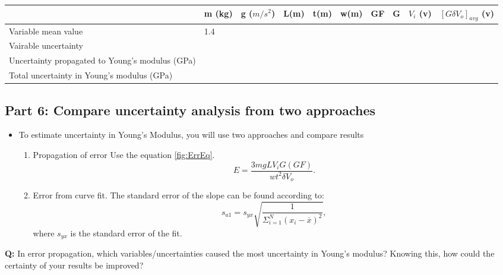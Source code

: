 \documentclass{article} %
\begin{document}
\begin{table}[H]
\vspace{0.2in}
\begin{tabular}{|p{5cm}| p{1cm}| p{1.1cm}| p{1cm}| p{1cm}| p{1cm}|p{1cm}| p{1cm}| p{1cm}| p{1.5cm}|}
\toprule \toprule
												& m (kg)   & g ($m/s^2$) & L(m) & t(m) & w(m)& GF & G  & $V_i$ (v) & $[G\delta V_o]_{avg}$ (v) \\ \toprule
Variable mean value   							 &     1.4 &             &      &      &     &    &    &           &                \\ \hline
Vairable uncertainty                            &         &             &      &      &     &    &    &           &                \\ \hline
Uncertainty propagated to Young's modulus (GPa) &         &             &      &      &     &    &    &           &                \\ \bottomrule
Total uncertainty in Young's modulus (GPa)      & \multicolumn{8}{c}{}   & \\ \bottomrule \bottomrule
\end{tabular}
\end{table}

\subsection{Part 6: Compare  uncertainty analysis from two approaches}
\begin{itemize}
\item To estimate uncertainty in Young’s Modulus, you will use two approaches and compare results
\begin{enumerate}
\item Propagation of error
Use the equation  \ref{fig:ErrEq}.
\begin{equation}
E = \frac{3mgLV_{i}G (GF)}{wt^2 \delta V_{o}}.
\label{fig:ErrEq}
\end{equation}
\item Error from curve fit. The standard error of the slope can be found according to:
\begin{equation}
s_{a1} = s_{yx} \sqrt{ \frac{1}{\Sigma_{i=1}^{N} (x_i - \overline{x})^2}},
\end{equation}
where $s_{yx}$ is the standard error of the fit.
\end{enumerate}
\end{itemize}

\textbf{Q:} In error propagation, which variables/uncertainties caused the most uncertainty in Young’s modulus? Knowing this, how could the certainty of your results be improved?\\
\end{document}
